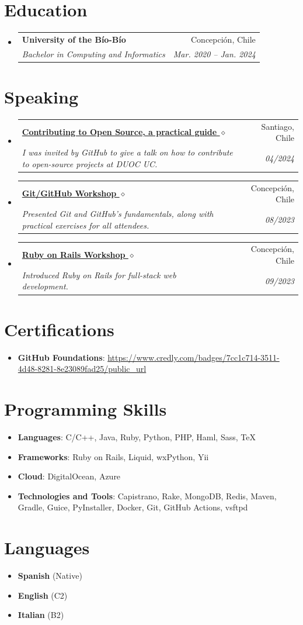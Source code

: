\documentclass[letterpaper,11pt]{article}
\makeatletter
\newcommand{\resumeSubheading}[4]{
  \vspace{-1pt}\item
    \begin{tabular*}{0.97\textwidth}[t]{l@{\extracolsep{\fill}}r}
      \textbf{#1} & #2 \\
      \textit{\small#3} & \textit{\small #4} \\
    \end{tabular*}\vspace{-5pt}
}
\newcommand{\resumeSubHeadingListStart}{\begin{itemize}[leftmargin=*]}
\newcommand{\resumeSubHeadingListEnd}{\end{itemize}}
\makeatother
\begin{document}
\section{Education}
	\resumeSubHeadingListStart
		\resumeSubheading
		{University of the Bío-Bío}{Concepción, Chile}
		{Bachelor in Computing and Informatics}{Mar. 2020 -- Jan. 2024}
		\resumeSubHeadingListEnd
    
\section{Speaking}
  \resumeSubHeadingListStart
    \resumeSubheading
	  {\href{https://youtu.be/S_qkjY7k_L8?t=2698}{Contributing to Open Source, a practical guide $\diamond$}}{Santiago, Chile}
	  {I was invited by GitHub to give a talk on how to contribute to open-source projects at DUOC UC.}{04/2024}
    \resumeSubheading
    {\href{https://bgm.dev/about}{Git/GitHub Workshop $\diamond$}}{Concepción, Chile}
    {Presented Git and GitHub’s fundamentals, along with practical exercises for all attendees.}{08/2023}
    \resumeSubheading
    {\href{https://bgm.dev/about}{Ruby on Rails Workshop $\diamond$}}{Concepción, Chile}
    {Introduced Ruby on Rails for full-stack web development.}{09/2023}
  \resumeSubHeadingListEnd

\section{Certifications}
\resumeSubHeadingListStart
\item{
	\textbf{GitHub Foundations}{: \url{https://www.credly.com/badges/7cc1c714-3511-4d48-8281-8e23089fad25/public_url}}
}
\resumeSubHeadingListEnd

\section{Programming Skills}
	\resumeSubHeadingListStart
		\item{
			\textbf{Languages}{: C/C++, Java, Ruby, Python, PHP, Haml, Sass, TeX}
		}
		\item{
			\textbf{Frameworks}{: Ruby on Rails, Liquid, wxPython, Yii}
		}
		\item{
			\textbf{Cloud}{: DigitalOcean, Azure}
		}
		\item{
			\textbf{Technologies and Tools}{: Capistrano, Rake, MongoDB, Redis, Maven, Gradle, Guice, PyInstaller, Docker, Git, GitHub Actions, vsftpd}
		}
	\resumeSubHeadingListEnd

\section{Languages}
\resumeSubHeadingListStart
\item{
  \textbf{Spanish}{ (Native)}
}
\item{
  \textbf{English}{ (C2)}
}
\item{
  \textbf{Italian}{ (B2)}
}
\resumeSubHeadingListEnd

\end{document}

